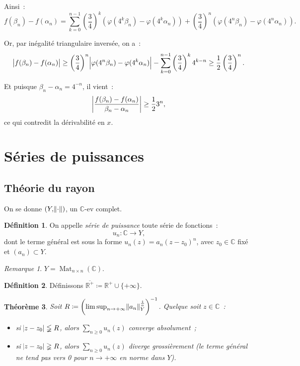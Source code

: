 \documentclass{report}
\newtheorem{thm}{Théorème}[chapter]
\theoremstyle{definition}
\newtheorem{déf}[thm]{Définition}
\theoremstyle{remark}
\newtheorem*{rmq}{Remarque}
\newcommand{\C}{\mathbb C}
\newcommand{\R}{\mathbb R}
\newcommand{\Rp}{\R^{+}}
\DeclareMathOperator{\Mat}{Mat}
\newcommand{\pinfty}{{+\infty}}
\begin{document}
			Ainsi~:
			\[f(\beta_n) - f(\alpha_n) = \sum_{k=0}^{n-1}\left(\frac 34\right)^k\left(\varphi(4^k\beta_n) - \varphi(4^k\alpha_n)\right) +
				\left(\frac 34\right)^n\left(\varphi(4^n\beta_n) - \varphi(4^n\alpha_n)\right).\]

			Or, par inégalité triangulaire inversée, on a~:
			\[\abs {f(\beta_n) - f(\alpha_n)} \geq \left(\frac 34\right)^n\abs {\varphi(4^n\beta_n) - \varphi(4^k\alpha_n)}
				- \sum_{k=0}^{n-1}\left(\frac 34\right)^k4^{k-n} \geq \frac 12\left(\frac 34\right)^n.\]

			Et puisque $\beta_n - \alpha_n = 4^{-n}$, il vient~:
			\[\abs {\frac {f(\beta_n) - f(\alpha_n)}{\beta_n - \alpha_n}} \geq \frac 123^n,\]
			ce qui contredit la dérivabilité en $x$.
	\section{Séries de puissances}
		\subsection{Théorie du rayon}
			On se donne $(Y, \norm \cdot)$, un $\C$-ev complet.

			\begin{déf} On appelle \textit{série de puissance} toute série de fonctions~:
			\[u_n : \C \to Y,\]
			dont le terme général est sous la forme $u_n(z) = a_n(z-z_0)^n$, avec $z_0 \in \C$ fixé et $(a_n) \subset Y$.
			\end{déf}

			\begin{rmq} $Y = \Mat_{n \times n}(\C)$.
			\end{rmq}

			\begin{déf} Définissons $\overline {\Rp} \coloneqq \Rp \cup \{\pinfty\}$.
			\end{déf}

			\begin{thm}\label{thm:rayondeconvergence} Soit $R \coloneqq \left(\limsup_{n \to \pinfty}\norm {a_n}_Y^{\frac 1n}\right)^{-1}$. Quelque soit
			$z \in \C$~:
			\begin{itemize}
				\item si $\abs {z - z_0} \lneqq R$, alors $\sum_{n \geq 0}u_n(z)$ converge absolument~;
				\item si $\abs {z - z_0} \gneqq R$, alors $\sum_{n \geq 0}u_n(z)$ diverge grossièrement (le terme général ne tend pas vers 0 pour $n \to \pinfty$
				en norme dans $Y$).
			\end{itemize}
			\end{thm}
\end{document}
